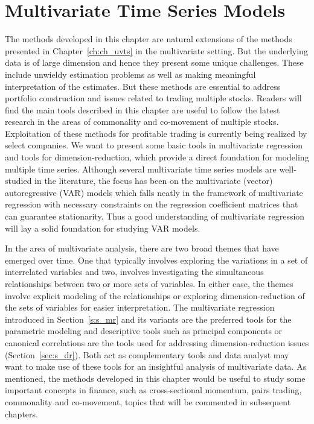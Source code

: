 \chapter{Multivariate Time Series Models\label{ch:ch_mvts}}

The methods developed in this chapter are natural extensions of the methods presented in Chapter~\ref{ch:ch_uvts} in the multivariate setting. But the underlying data is of large dimension and hence they present some unique challenges. These include unwieldy estimation problems as well as making meaningful interpretation of the estimates. But these methods are essential to address portfolio construction and issues related to trading multiple stocks. Readers will find the main tools described in this chapter are useful to follow the latest research in the areas of commonality and co-movement of multiple stocks. Exploitation of these methods for profitable trading is currently being realized by select companies. We want to present some basic tools in multivariate regression and tools for dimension-reduction, which provide a direct foundation for modeling multiple time series. Although several multivariate time series models are well-studied in the literature, the focus has been on the multivariate (vector) autoregressive (VAR) models which falls neatly in the framework of multivariate regression with necessary constraints on the regression coefficient matrices that can guarantee stationarity. Thus a good understanding of multivariate regression will lay a solid foundation for studying VAR models.


In the area of multivariate analysis, there are two broad themes that have emerged over time. One that typically involves exploring the variations in a set of interrelated variables and two, involves investigating the simultaneous relationships between two or more sets of variables. In either case, the themes involve explicit modeling of the relationships or exploring dimension-reduction of the sets of variables for easier interpretation. The multivariate regression introduced in Section~\ref{s:s_mr} and its variants are the preferred tools for the parametric modeling and descriptive tools such as principal components or canonical correlations are the tools used for addressing dimension-reduction issues (Section~\ref{sec:s_dr}). Both act as complementary tools and data analyst may want to make use of these tools for an insightful analysis of multivariate data. As mentioned, the methods developed in this chapter would be useful to study some important concepts in finance, such as cross-sectional momentum, pairs trading, commonality and co-movement, topics that will be commented in subsequent chapters.



